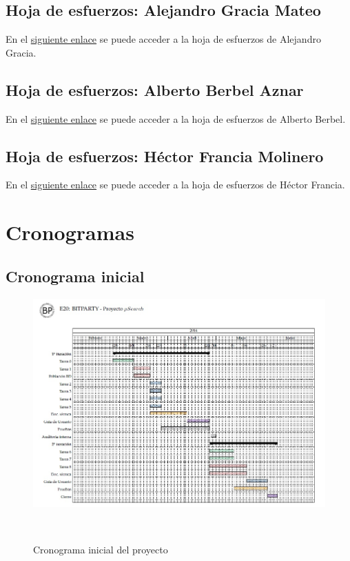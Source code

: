 \documentclass[10pt,spanish]{article}
\let\stdsection\section
\renewcommand\section{\newpage\stdsection}
\newcommand{\hojaesfuerzos}[2]{\href{run:../../recopilacion_esfuerzos/#1.xls}{#2}}
\begin{document}
\subsection{Hoja de esfuerzos: Alejandro Gracia Mateo}
%
En el \hojaesfuerzos{alejandro_recopilacion_esfuerzos}{siguiente enlace} se puede acceder a la hoja de 
esfuerzos de Alejandro Gracia.

\subsection{Hoja de esfuerzos: Alberto Berbel Aznar}
%
En el \hojaesfuerzos{alberto_recopilacion_esfuerzos}{siguiente enlace} se puede acceder a la hoja de 
esfuerzos de Alberto Berbel.

\subsection{Hoja de esfuerzos: Héctor Francia Molinero}
%
En el \hojaesfuerzos{hector_recopilacion_esfuerzos}{siguiente enlace} se puede acceder a la hoja de 
esfuerzos de Héctor Francia.


\section{Cronogramas}\label{sec:cronogramas}

\subsection{Cronograma inicial}
%
\vspace{.2cm}
\begin{figure}[ht]
	\centerline{\includegraphics[scale=0.80]{img/cronograma_inicial}}\
	\caption{Cronograma inicial del proyecto}
	\label{fig:cronogramaInicial}
\end{figure}
\newpage
\end{document}

